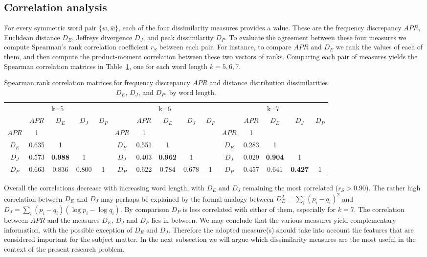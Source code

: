 \documentclass[review,12pt]{elsarticle}
\begin{document}
\subsection{Correlation analysis}
For every symmetric word pair $\{w,\bar{w}\}$,
each of the four dissimilarity measures
provides a value.
These are the frequency discrepancy $APR$,
Euclidean distance $D_E$,
Jeffreys divergence $D_J$, and
peak dissimilarity $D_P$.
To evaluate the agreement between these four
measures we compute Spearman's rank
correlation coefficient $r_S$ between each pair.
For instance, to compare $APR$ and $D_E$ we rank
the values of each of them, and then compute
the product-moment correlation between these
two vectors of ranks.
Comparing each pair of measures yields the
Spearman correlation
matrices in Table~\ref{tab:spearman_complete},
one for each word length $k=5,6,7$.

\begin{table}[htbp]
\centering
\scriptsize
\caption{Spearman rank correlation
	matrices for frequency discrepancy $APR$ and distance
	distribution dissimilarities $D_E$, $D_J$,
	and $D_P$, by word length.}
\renewcommand{\arraystretch}{1.2}
\setlength\tabcolsep{2.5pt}
\begin{tabular}{|c|cccc|c|cccc|c|cccc|}
\hline
\multicolumn{5}{|c|}{k=5}  &
    \multicolumn{5}{|c|}{k=6} &
		\multicolumn{5}{|c|}{k=7} \\
\cline{2-5}\cline{7-10}\cline{12-15}
  & $APR$ & $D_E$ & $D_J$ & $D_P$ &
  & $APR$ & $D_E$ & $D_J$ & $D_P$ &	
  & $APR$ & $D_E$ & $D_J$ & $D_P$ \\	
\hline
  $APR$ & 1 &  &  &  &
  $APR$ & 1 &  &  &  &
  $APR$ & 1 &  &  &  \\
  $D_E$ & 0.635 & 1 &  &  &
	$D_E$ & 0.551 & 1 &  &  &
	$D_E$ & 0.283 & 1 &  &  \\
  $D_J$ & 0.573 & \bf{0.988} & 1 &  &
	$D_J$ &	0.403 & \bf{0.962} & 1 &  &
	$D_J$ & 0.029 & \bf{0.904} & 1 &  \\
  $D_P$ & 0.663 & 0.836 & 0.800 & 1 &
	$D_P$ & 0.622 & 0.784 & 0.678 & 1 &
	$D_P$	& 0.457 & 0.641 & \bf{0.427} & 1 \\
\hline
\end{tabular}
\label{tab:spearman_complete}
\end{table}

Overall the correlations decrease with increasing
word length, with $D_E$ and $D_J$ remaining the
most correlated ($r_S>0.90$).
The rather high correlation between $D_E$ and
$D_J$ may perhaps be explained by the formal
analogy between $D_E^2 = \sum_i (p_i-q_i)^2$
and  $D_J = \sum_i (p_i-q_i)(\log p_i-\log q_i)$.
By comparison $D_P$ is less correlated with
either of them, especially for $k=7$.
The correlation between $APR$ and the measures
$D_E$, $D_J$ and $D_P$ lies in between.
We may conclude that the various measures yield
complementary information, with the possible
exception of $D_E$ and $D_J$.
Therefore the adopted measure(s) should take
into account the features that are considered
important for the subject matter.
In the next subsection we will argue which
dissimilarity measures are the most useful in
the context of the present research problem.
\end{document}
